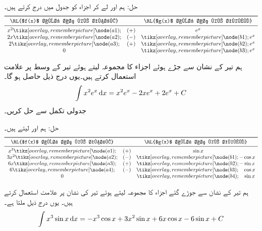 حل:\quad
ہم  اور  لے کر اجزاء کو جدول میں درج کرتے ہیں۔
\begin{align*}
\begin{array}{ccc}
\toprule
\text{\RL{$f(x)$ اور اس کے تفرق}}&&\text{\RL{$g(x)$ اور اس کے تکمل}}\\
\midrule
x^2\tikzmark{a1}&(+)&e^x\\
2x\tikzmark{a2}&(-)&\tikzmark{b1}e^x\\
2\tikzmark{a3}&(+)&\tikzmark{b2}e^x\\
0&&\tikzmark{b3}e^x
\end{array}
\end{align*}
ہم تیر کے نشان سے جڑے ہوئے اجزاء کا مجموعہ لیتے ہوئے تیر کے وسط پر علامت استعمال کرتے ہیں۔یوں درج ذیل حاصل ہو گا۔
\begin{align*}
\int x^2e^x\dif x=x^2e^x-2xe^x+2e^x+C
\end{align*}
جدولی تکمل سے  حل کریں۔

حل:\quad
ہم  اور  لیتے ہیں۔
\begin{align*}
\begin{array}{ccc}
\toprule
\text{\RL{$f(x)$ اور اس کے تفرق}}&&\text{\RL{$g(x)$ اور اس کے تکمل}}\\
\midrule
x^3\tikzmark{a1}&(+)&\phantom{+}\sin x\\
3x^2\tikzmark{a2}&(-)&\tikzmark{b1}-\cos x\\
6x\tikzmark{a3}&(+)&\tikzmark{b2}-\sin x\\
6\tikzmark{a4}&(-)&\tikzmark{b3}\phantom{-}\cos x\\
0&&\tikzmark{b4}\phantom{-}\sin x
\end{array}
\end{align*}
ہم تیر کے نشان سے جوڑے گئے اجزاء کا مجموعہ لیتے ہوئے تیر کی نشان پر علامت استعمال کرتے ہیں۔ یوں درج ذیل ملتا ہے۔
\begin{align*}
\int x^3\sin x\dif x=-x^3\cos x+3x^2\sin x+6x\cos x-6\sin x+C
\end{align*}

